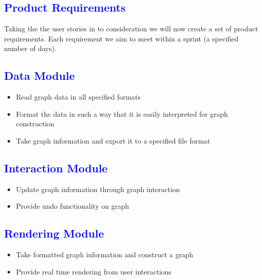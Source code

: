 \documentclass[12pt]{article}
\begin{document}
\textcolor{blue}{\section{Product Requirements}}
\begin{flushleft}

	Taking the the user stories in to consideration we will now create a set of product requirements. Each requirement we aim to meet within a sprint (a specified number of days).
	
	\textcolor{blue}{\subsection{Data Module}}	
	\begin{flushleft}
	\begin{itemize}
	\item Read graph data in all specified formats
	\item Format the data in such a way that it is easily interpreted for graph construction
	\item Take graph information and export it to a specified file format
	\end{itemize}	
	\end{flushleft}
	
	\textcolor{blue}{\subsection{Interaction Module}}	
	\begin{flushleft}
	\begin{itemize}
	\item Update graph information through graph interaction
	\item Provide undo functionality on graph
	\end{itemize}	
	\end{flushleft}
	
	\textcolor{blue}{\subsection{Rendering Module}}	
	\begin{flushleft}
	\begin{itemize}
	\item Take formatted graph information and construct a graph
	\item Provide real time rendering from user interactions
	\end{itemize}	
	\end{flushleft}
	

\end{flushleft}
\end{document}
